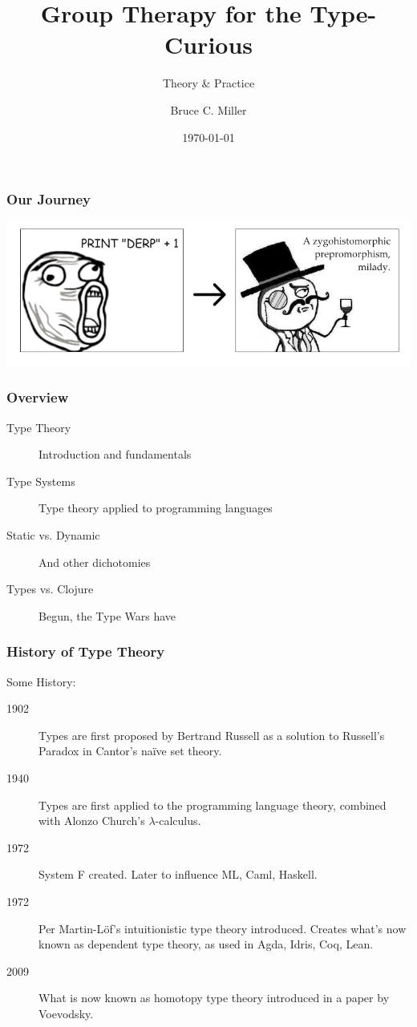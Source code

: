 \documentclass{beamer}
\title{Group Therapy for the Type-Curious}
\subtitle{Theory \& Practice}
\author{Bruce C. Miller}
\institute{bm3719@gmail.com}
\date{\today}
\begin{document}
\begin{frame}
  \titlepage
\end{frame}

\begin{frame}
  \frametitle{Our Journey}
  \centerline{\includegraphics[scale=0.4]{img/transformation.png}}
\end{frame}

\begin{frame}
  \frametitle{Overview}
  \begin{description}
  \item[Type Theory] Introduction and fundamentals
  \item[Type Systems] Type theory applied to programming languages
  \item[Static vs. Dynamic] And other dichotomies
  \item[Types vs. Clojure] Begun, the Type Wars have
  \end{description}
\end{frame}

\begin{frame}
  \frametitle{History of Type Theory}
  Some History:
  \begin{description}
  \item[1902] Types are first proposed by Bertrand Russell as a solution to
    Russell's Paradox in Cantor's na{\"i}ve set theory.
  \item[1940] Types are first applied to the programming language theory,
    combined with Alonzo Church's $\lambda$-calculus.
  \item[1972] System F created.  Later to influence ML, Caml, Haskell.
  \item[1972] Per Martin-L{\"o}f's intuitionistic type theory introduced.
    Creates what's now known as dependent type theory, as used in Agda, Idris,
    Coq, Lean.
  \item[2009] What is now known as homotopy type theory introduced in a paper
    by Voevodsky.
  \end{description}
\end{frame}
\end{document}
